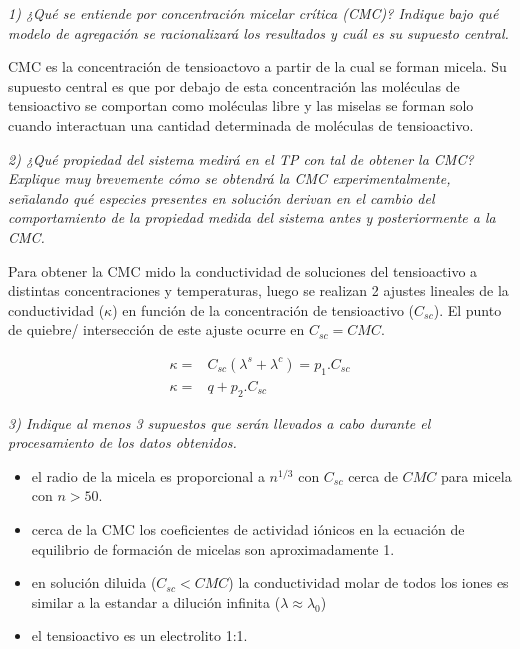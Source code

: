 \thispagestyle{empty}
\textit{1) ¿Qué se entiende por concentración micelar crítica (CMC)? Indique bajo qué modelo de agregación se racionalizará los resultados y cuál es su supuesto central.}

\bigskip

CMC es la concentración de tensioactovo a partir de la cual se forman micela.
Su supuesto central es que por debajo de esta concentración las moléculas de tensioactivo se comportan como moléculas libre y las miselas se forman solo cuando interactuan una cantidad determinada de moléculas de tensioactivo.



\bigskip
\textit{2) ¿Qué propiedad del sistema medirá en el TP con tal de obtener la CMC?
Explique muy brevemente cómo se obtendrá la CMC experimentalmente, señalando qué especies presentes en solución derivan en el cambio del comportamiento de la propiedad medida del sistema antes y posteriormente a la CMC.}
\bigskip

Para obtener la CMC mido la conductividad de soluciones del tensioactivo a distintas concentraciones y temperaturas, luego se realizan 2 ajustes lineales de la conductividad ($\kappa$) en función de la concentración de tensioactivo ($C_{sc}$). El punto de quiebre/ intersección de este ajuste ocurre en $C_{sc}=CMC$.

\begin{align*}
    \kappa =& C_{sc} (\lambda^s+\lambda^c)=p_1.C_{sc}\\
    \kappa =& q+p_2.C_{sc}
\end{align*}





\bigskip
\textit{3) Indique al menos 3 supuestos que serán llevados a cabo durante el procesamiento de los datos obtenidos.}
\bigskip

\begin{itemize}
    \item el radio de la micela es proporcional a $n^{1/3}$ con $C_{sc}$ cerca de $CMC$ para micela con $n>50$.
    \item cerca de la CMC los coeficientes de actividad iónicos en la ecuación de equilibrio de formación de micelas son aproximadamente 1.
    \item en solución diluida ($C_{sc}<CMC$) la conductividad molar de todos los iones es similar a la estandar a dilución infinita ($\lambda \approx \lambda_0$)
    \item el tensioactivo es un electrolito 1:1.
\end{itemize}


